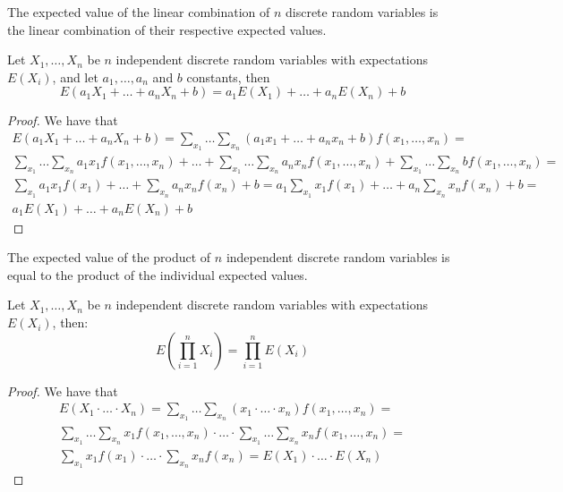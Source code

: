The expected value of the linear combination of $n$ discrete random variables is the linear combination of their respective expected values.

\begin{proposition}
Let $X_{1}, \ldots, X_{n}$ be $n$ independent discrete random variables with expectations $E\left(X_{i}\right)$, and let $a_1, \ldots, a_n$ and $b$ constants, then
\[
E\left(a_{1}X_{1}+\ldots+a_{n}X_{n}+b\right)=a_{1}E\left(X_{1}\right)+\ldots+a_{n}E\left(X_{n}\right)+b
\]
\end{proposition}
\begin{proof}
We have that
\begin{multline}
E \left(a_1 X_1 + \ldots + a_n X_n +b \right) = 
\sum_{x_1} \ldots \sum_{x_n} \left(a_ 1 x_1 + \ldots + a_n x_n + b  \right) f\left(x_1, \ldots, x_n \right) = \\
\sum_{x_1} \ldots \sum_{x_n} a_1 x_1 f\left(x_1, \ldots, x_n \right) + \ldots + \sum_{x_1} \ldots \sum_{x_n} a_n x_n f\left(x_1, \ldots, x_n \right) + \sum_{x_1} \ldots \sum_{x_n} b f\left(x_1, \ldots, x_n \right) = \\
\sum_{x_1} a_1 x_1 f\left(x_1\right) + \ldots + \sum_{x_n} a_n x_n f\left( x_n \right) + b = 
a_1 \sum_{x_1} x_1 f\left(x_1\right) + \ldots + a_n \sum_{x_n} x_n f\left( x_n \right) + b = \\
a_1 E\left(X_1\right) + \ldots + a_n E\left(X_n\right) + b
\end{multline}
\end{proof}

The expected value of the product of $n$ independent discrete random variables is equal to the product of the individual expected values.

\begin{proposition}
Let $X_{1}, \ldots, X_{n}$ be $n$ independent discrete random variables with expectations $E\left(X_{i}\right)$, then:
\[
E\left(\prod_{i=1}^{n}X_{i}\right)=\prod_{i=1}^{n}E\left(X_{i}\right)
\]
\end{proposition}
\begin{proof}
We have that
\begin{multline}
E \left(X_1  \cdot \ldots \cdot X_n  \right) = 
\sum_{x_1} \ldots \sum_{x_n} \left(x_1 \cdot \ldots \cdot x_n  \right) f\left(x_1, \ldots, x_n \right) = \\
\sum_{x_1} \ldots \sum_{x_n} x_1 f\left(x_1, \ldots, x_n \right) \cdot \ldots \cdot \sum_{x_1} \ldots \sum_{x_n} x_n f\left(x_1, \ldots, x_n \right) = \\
\sum_{x_1} x_1 f\left(x_1\right) \cdot \ldots \cdot \sum_{x_n} x_n f\left( x_n \right) = 
E \left( X_1 \right) \cdot \ldots \cdot E \left( X_n \right)
\end{multline}
\end{proof}

